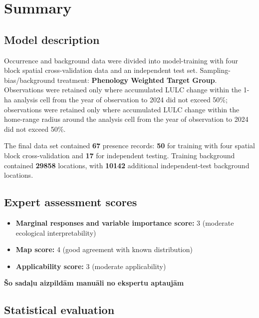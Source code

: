 \documentclass[
  openany]{book}
\providecommand{\tightlist}{%
  \setlength{\itemsep}{0pt}\setlength{\parskip}{0pt}}
\providecommand{\tightlist}{%
  \setlength{\itemsep}{0pt}%
  \setlength{\parskip}{0pt}%
}
\begin{document}
\section*{Summary}\label{summary-12}

\subsection*{Model description}\label{model-description-12}

Occurrence and background data were divided into model-training with four block spatial cross-validation data and an independent test set. Sampling-bias/background treatment: \textbf{Phenology Weighted Target Group}. Observations were retained only where accumulated LULC change within the 1-ha analysis cell from the year of observation to 2024 did not exceed 50\%; observations were retained only where accumulated LULC change within the home-range radius around the analysis cell from the year of observation to 2024 did not exceed 50\%.

The final data set contained \textbf{67} presence records: \textbf{50} for training with four spatial block cross-validation and \textbf{17} for independent testing. Training background contained \textbf{29858} locations, with \textbf{10142} additional independent-test background locations.

\subsection*{Expert assessment scores}\label{expert-assessment-scores-12}

\begin{itemize}
\tightlist
\item
  \textbf{Marginal responses and variable importance score:} 3 (moderate ecological interpretability)
\item
  \textbf{Map score:} 4 (good agreement with known distribution)
\item
  \textbf{Applicability score:} 3 (moderate applicability)
\end{itemize}

\textbf{Šo sadaļu aizpildām manuāli no ekspertu aptaujām}

\subsection*{Statistical evaluation}\label{statistical-evaluation-12}
\end{document}

